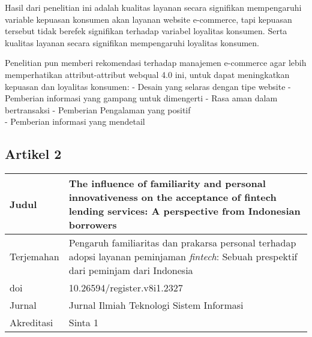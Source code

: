 \documentclass{article}
\begin{document}
Hasil dari penelitian ini adalah 
kualitas layanan secara signifikan mempengaruhi  variable
kepuasan konsumen akan layanan website e-commerce, 
tapi kepuasan tersebut 
tidak berefek signifikan terhadap variabel loyalitas konsumen.
Serta kualitas layanan secara signifikan mempengaruhi  loyalitas konsumen.

Penelitian pun memberi rekomendasi terhadap  manajemen e-commerce
agar lebih memperhatikan attribut-attribut webqual 4.0 ini,
untuk dapat meningkatkan kepuasan dan loyalitas konsumen:\newline
 - Desain yang selaras dengan tipe website\newline
 - Pemberian informasi yang gampang untuk dimengerti\newline
 - Rasa aman dalam bertransaksi\newline
 - Pemberian Pengalaman yang positif\\
 - Pemberian informasi yang mendetail\newline

 \subsection{Artikel 2}

\smallbreak
\begin{tabular}{|p{2cm}|p{12cm}|}
    \hline
    Judul & The influence of familiarity and personal innovativeness on
    the acceptance of fintech lending services: A perspective from
    Indonesian borrowers \cite{TheInfluenceOWirani2021} \\
    \hline
    Terjemahan & Pengaruh familiaritas dan prakarsa personal 
    terhadap adopsi layanan peminjaman \emph{fintech}: Sebuah prespektif dari peminjam dari Indonesia \\
    \hline
    doi & 10.26594/register.v8i1.2327\\    
    \hline
    Jurnal & Jurnal Ilmiah Teknologi Sistem Informasi\\
    \hline
    Akreditasi & Sinta 1\\
    \hline
\end{tabular}
\smallbreak
\end{document}
